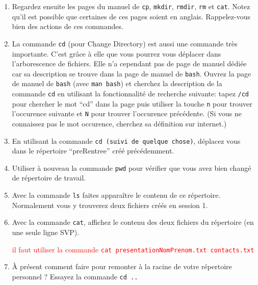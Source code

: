 \documentclass{article}
\begin{document}
\newpage

\begin{exercice}

\begin{enumerate}
\def\labelenumi{\arabic{enumi}.}
\item
  Regardez ensuite les pages du manuel de \texttt{cp}, \texttt{mkdir},
  \texttt{rmdir}, \texttt{rm} et \texttt{cat}.
  Notez qu'il est possible que certaines de ces pages soient en anglais. Rappelez-vous bien des actions de ces commandes.
\item
  La commande \texttt{cd} (pour Change Directory) est aussi une commande très importante. C'est grâce à elle que vous pourrez vous déplacer dans l'arborescence de fichiers. 
  Elle n'a cependant pas de page de manuel dédiée car sa description se trouve dans la page de manuel de \texttt{bash}. 
  Ouvrez la page de manuel de \texttt{bash} (avec \texttt{man bash}) et cherchez la description de la commande \texttt{cd} en
  utilisant la fonctionnalité de recherche suivante: tapez \texttt{/cd}
  pour chercher le mot ``cd'' dans la page puis utiliser la touche
  \texttt{n} pour trouver l'occurence suivante et \texttt{N} pour
  trouver l'occurence précédente. (Si vous ne connaissez pas le mot occurence, cherchez sa définition sur internet.)
\item
 En utilisant la commande \texttt{cd (suivi de quelque chose)}, déplacez vous dans le répertoire ``preRentree'' créé précédemment.
\item
 Utiliser à nouveau la commande \texttt{pwd} pour vérifier que vous avez bien changé de répertoire de travail.
\item
 Avec la commande \texttt{ls} faites apparaître le contenu de ce répertoire. Normalement vous y trouverez deux fichiers créés en session 1.
\item
Avec la commande \texttt{cat}, affichez le contenu des deux fichiers du répertoire (en une seule ligne SVP).

\begin{correction}
\textcolor{red}{il faut utiliser la commande \texttt{cat presentationNomPrenom.txt contacts.txt}}
\end{correction}

\item
À présent comment faire pour remonter à la racine de votre répertoire personnel ? Essayez la commande \texttt{cd ..}
\end{enumerate}

\end{exercice}
\end{document}

